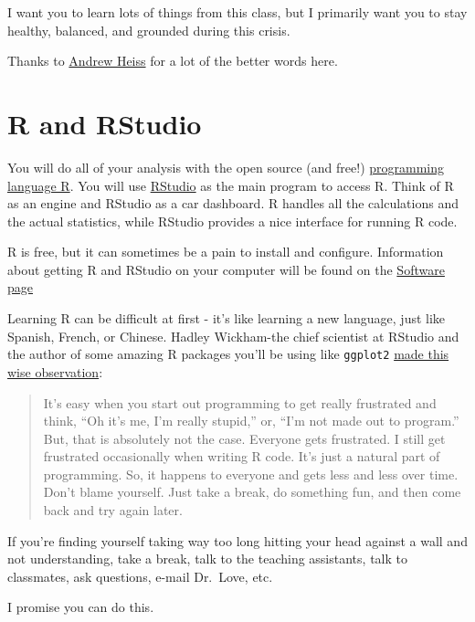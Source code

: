 \documentclass[
]{book}
\begin{document}
I want you to learn lots of things from this class, but I primarily want you to stay healthy, balanced, and grounded during this crisis.

Thanks to \href{https://econf20.classes.andrewheiss.com/syllabus/\#learning-during-a-pandemic}{Andrew Heiss} for a lot of the better words here.

\hypertarget{r-and-rstudio}{%
\section{R and RStudio}\label{r-and-rstudio}}

You will do all of your analysis with the open source (and free!) \href{https://cloud.r-project.org}{programming language R}. You will use \href{https://www.rstudio.com/}{RStudio} as the main program to access R. Think of R as an engine and RStudio as a car dashboard. R handles all the calculations and the actual statistics, while RStudio provides a nice interface for running R code.

R is free, but it can sometimes be a pain to install and configure. Information about getting R and RStudio on your computer will be found on the \href{software.html}{Software page}

Learning R can be difficult at first - it's like learning a new language, just like Spanish, French, or Chinese. Hadley Wickham-the chief scientist at RStudio and the author of some amazing R packages you'll be using like \texttt{ggplot2} \href{https://r-posts.com/advice-to-young-and-old-programmers-a-conversation-with-hadley-wickham/}{made this wise observation}:

\begin{quote}
It's easy when you start out programming to get really frustrated and think, ``Oh it's me, I'm really stupid,'' or, ``I'm not made out to program.'' But, that is absolutely not the case. Everyone gets frustrated. I still get frustrated occasionally when writing R code. It's just a natural part of programming. So, it happens to everyone and gets less and less over time. Don't blame yourself. Just take a break, do something fun, and then come back and try again later.
\end{quote}

If you're finding yourself taking way too long hitting your head against a wall and not understanding, take a break, talk to the teaching assistants, talk to classmates, ask questions, e-mail Dr.~Love, etc.

I promise you can do this.
\end{document}
